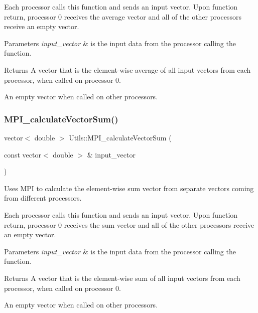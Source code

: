 Each processor calls this function and sends an input vector. Upon function return, processor 0 receives the average vector and all of the other processors receive an empty vector. 
\begin{DoxyParams}{Parameters}
{\em input\+\_\+vector} & is the input data from the processor calling the function. \\
\hline
\end{DoxyParams}
\begin{DoxyReturn}{Returns}
A vector that is the element-\/wise average of all input vectors from each processor, when called on processor 0. 

An empty vector when called on other processors. 
\end{DoxyReturn}
\mbox{\label{namespace_utils_ae42867cb7be2aca3ff23e27a94c4f68b}} 
\subsubsection{\texorpdfstring{M\+P\+I\+\_\+calculate\+Vector\+Sum()}{MPI\_calculateVectorSum()}\hspace{0.1cm}{\footnotesize\ttfamily [1/2]}}
{\footnotesize\ttfamily vector$<$ double $>$ Utils\+::\+M\+P\+I\+\_\+calculate\+Vector\+Sum (\begin{DoxyParamCaption}\item[{const vector$<$ double $>$ \&}]{input\+\_\+vector }\end{DoxyParamCaption})}



Uses M\+PI to calculate the element-\/wise sum vector from separate vectors coming from different processors. 

Each processor calls this function and sends an input vector. Upon function return, processor 0 receives the sum vector and all of the other processors receive an empty vector. 
\begin{DoxyParams}{Parameters}
{\em input\+\_\+vector} & is the input data from the processor calling the function. \\
\hline
\end{DoxyParams}
\begin{DoxyReturn}{Returns}
A vector that is the element-\/wise sum of all input vectors from each processor, when called on processor 0. 

An empty vector when called on other processors. 
\end{DoxyReturn}
\mbox{\label{namespace_utils_a07efe2f58beb35b78d295a0b0dc1f660}} 
